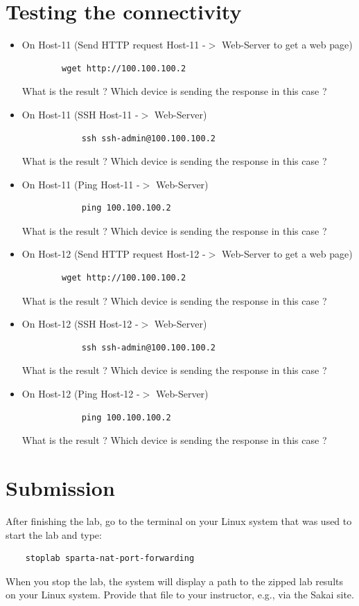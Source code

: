 \section{Testing the connectivity}
\begin{itemize}
	\item On Host-11 (Send HTTP request Host-11 -$>$ Web-Server to get a web page)
	\begin{verbatim}
	    wget http://100.100.100.2
	\end{verbatim}

	What is the result ? Which device is sending the response in this case ?

	\item On Host-11 (SSH Host-11 -$>$ Web-Server)
	\begin{verbatim}
			ssh ssh-admin@100.100.100.2
	\end{verbatim}

	What is the result ? Which device is sending the response in this case ?

	\item On Host-11 (Ping Host-11 -$>$ Web-Server)
	\begin{verbatim}
			ping 100.100.100.2
	\end{verbatim}

	What is the result ? Which device is sending the response in this case ?

	\item On Host-12 (Send HTTP request Host-12 -$>$ Web-Server to get a web page)
	\begin{verbatim}
	    wget http://100.100.100.2
	\end{verbatim}

	What is the result ? Which device is sending the response in this case ?

	\item On Host-12 (SSH Host-12 -$>$ Web-Server)
	\begin{verbatim}
			ssh ssh-admin@100.100.100.2
	\end{verbatim}

	What is the result ? Which device is sending the response in this case ?

	\item On Host-12 (Ping Host-12 -$>$ Web-Server)
	\begin{verbatim}
			ping 100.100.100.2
	\end{verbatim}

	What is the result ? Which device is sending the response in this case ?
\end{itemize}

\section{Submission}
After finishing the lab, go to the terminal on your Linux system that was used to start the lab and type:
\begin{verbatim}
    stoplab sparta-nat-port-forwarding
\end{verbatim}
When you stop the lab, the system will display a path to the zipped lab results on your Linux system.  Provide that file to
your instructor, e.g., via the Sakai site.


